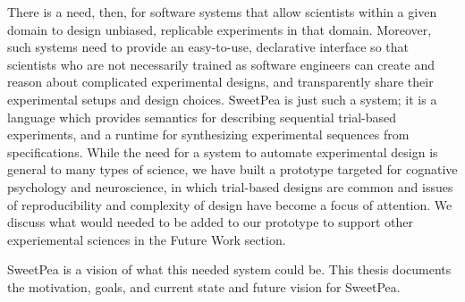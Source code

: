 There is a need, then, for software systems that allow scientists within a given domain to design unbiased, replicable experiments in that domain. Moreover, such systems need to provide an easy-to-use, declarative interface so that scientists who are not necessarily trained as software engineers can create and reason about complicated experimental designs, and transparently share their experimental setups and design choices. SweetPea is just such a system; it is a language which provides semantics for describing sequential trial-based experiments, and a runtime for synthesizing experimental sequences from specifications. While the need for a system to automate experimental design is general to many types of science, we have built a prototype targeted for cognative psychology and neuroscience, in which trial-based designs are common and issues of reproducibility and complexity of design have become a focus of attention. We discuss what would needed to be added to our prototype to support other experiemental sciences in the Future Work section.

SweetPea is a vision of what this needed system could be. This thesis documents the motivation, goals, and current state and future vision for SweetPea.




